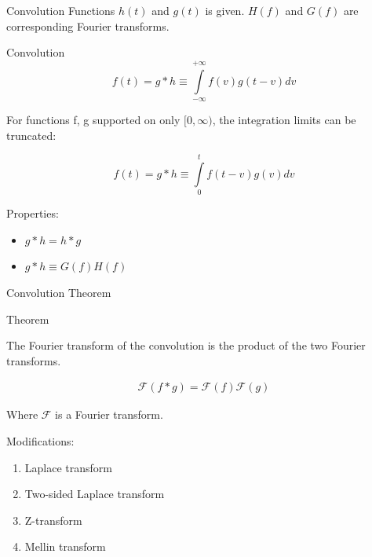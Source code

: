 \documentclass[10pt]{beamer}
\begin{document}
\begin{frame}{Convolution}
Functions $h(t)$ and $g(t)$ is given. $H(f)$ and $G(f)$ are corresponding Fourier transforms. 

\medskip

\begin{block}{Convolution}
\begin{equation}
    f(t) = g * h \equiv \int \limits_{-\infty}^{+\infty} f(v) g(t - v) dv 
\end{equation}

For functions f, g supported on only $[0, \infty)$, the integration limits can be truncated:

\begin{equation}
    f(t) = g * h \equiv \int \limits_{0}^{t} f(t- v) g(v) dv 
\end{equation}

\end{block}

\begin{block}{Properties:}

\begin{itemize}
    \item $g*h = h*g$
    \item $g*h \equiv G(f)H(f)$
\end{itemize}

\end{block}

\end{frame}

\begin{frame}{Convolution Theorem}

\begin{block}{Theorem}

The Fourier transform of the convolution is the product of the two Fourier transforms.

\begin{align}
    \mathcal{F}(f*g) = \mathcal{F}(f)\mathcal{F}(g)
\end{align}

Where $\mathcal{F}$ is a Fourier transform.

\end{block}

\begin{block}{Modifications:}
\begin{enumerate}
    \item Laplace transform \\
    \item Two-sided Laplace transform\\
    \item Z-transform \\
    \item Mellin transform
\end{enumerate}
\end{block}
    
\end{frame}
\end{document}

